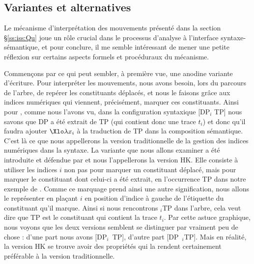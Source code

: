 







\subsection{Variantes et alternatives}
\label{sss:VarianteMvt}


\sloppy 

Le mécanisme d'interprétation des mouvements présenté dans la section \S\ref{ss:iss:Qu} joue un rôle crucial dans le processus d'analyse à l'interface syntaxe-sémantique, et pour conclure, il me semble intéressant de mener une petite réflexion sur certains aspects formels et procéduraux du mécanisme.

\fussy

Commençons par ce qui peut sembler, à première vue, une anodine variante d'écriture.  Pour interpréter les mouvements, nous avons besoin, lors du parcours de l'arbre, de repérer les constituants déplacés, et nous le faisons grâce aux indices numériques qui viennent, précisément, marquer ces constituants.  Ainsi pour , comme nous l'avons vu, dans la configuration syntaxique [DP$_i$ TP] nous savons que DP a été extrait de TP (qui contient donc une trace $t_i$) et donc qu'il faudra ajouter $\Xlo\lambda x_i$ à la traduction de TP dans la composition sémantique.  C'est là ce que nous appellerons la version traditionnelle de la gestion des indices numériques dans la syntaxe. 
La variante que nous allons examiner a été introduite et défendue  par \citet{HeimKratzer:97} et nous l'appellerons la version HK. %
Elle consiste à utiliser les indices $i$ non pas pour marquer un constituant déplacé, mais pour marquer le constituant dont celui-ci a été extrait, en l'occurrence TP dans notre exemple de .
Comme ce marquage prend ainsi une autre signification, nous allons le représenter en plaçant $i$ en position d'indice à gauche de l'étiquette du constituant qu'il marque.  Ainsi si nous rencontrons ${}_i$TP dans l'arbre, cela veut dire que TP est le constituant qui contient la trace $t_i$.  Par cette astuce graphique, nous voyons que les deux versions semblent se distinguer par vraiment peu de chose : d'une part nous avons 
[DP$_i$~TP], d'autre part  [DP~${}_i$TP].  
Mais en réalité, la version HK se trouve avoir des propriétés qui la rendent certainement préférable à la version traditionnelle.

